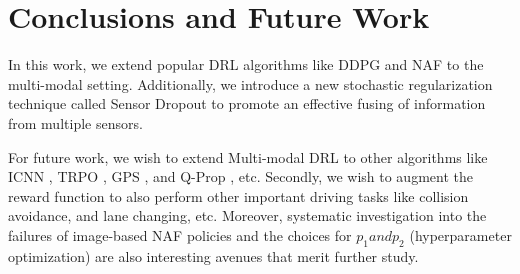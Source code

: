 \documentclass[../thesis.tex]{subfiles}
\begin{document}
\section{Conclusions and Future Work}
In this work, we extend popular DRL algorithms like DDPG and NAF to the multi-modal setting. Additionally, we introduce a new stochastic regularization technique called Sensor Dropout to promote an effective fusing of information from multiple sensors. 


For future work, we wish to extend Multi-modal DRL to other algorithms like ICNN \cite{amos2016input}, TRPO \cite{TRPO}, GPS \cite{levine2013guided}, and Q-Prop \cite{DBLP:journals/corr/GuLGTL16}, etc. Secondly, we wish to augment the reward function to also perform other important driving tasks like collision avoidance, and lane changing, etc. Moreover, systematic investigation into the failures of image-based NAF policies and the choices for $p_1 and p_2$ (hyperparameter optimization) are also interesting avenues that merit further study.
\end{document}
